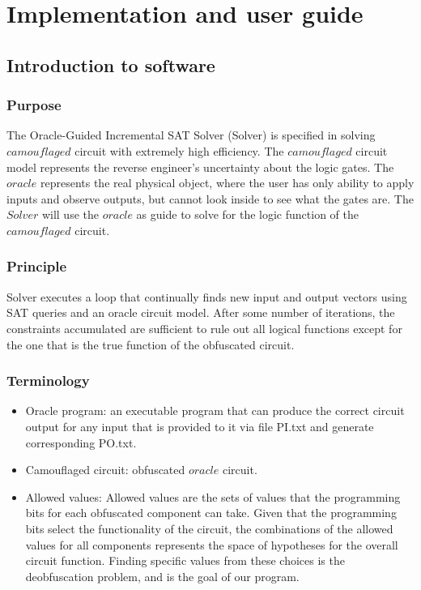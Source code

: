 \documentclass[proposal]{umassthesis}  %
\begin{document}
\chapter{Implementation and user guide}

\section{Introduction to software}
	\subsection{Purpose}
	The Oracle-Guided Incremental SAT Solver (Solver) is specified in solving $camouflaged$ circuit with extremely high efficiency. The $camouflaged$ circuit model represents the reverse engineer's uncertainty about the logic gates. The $oracle$ represents the real physical object, where the user has only ability to apply inputs and observe outputs, but cannot look inside to see what the gates are. The $Solver$ will use the $oracle$ as guide to solve for the logic function of the $camouflaged$ circuit. 	
	\subsection{Principle} 
	Solver executes a loop that continually finds new input and output vectors using SAT queries and an oracle circuit model. After some number of iterations, the constraints accumulated are sufficient to rule out all logical functions except for the one that is the true function of the obfuscated circuit. 
	\subsection{Terminology}
		\begin{itemize}
			\item Oracle program: an executable program that can produce the correct circuit output for any input that is provided to it via file PI.txt and generate corresponding PO.txt.
			\item Camouflaged circuit: obfuscated $oracle$ circuit.
			\item Allowed values: Allowed values are the sets of values that the programming bits for each obfuscated component can take. Given that the programming bits select the functionality of the circuit, the combinations of the allowed values for all components represents the space of hypotheses for the overall circuit function. Finding specific values from these choices is the deobfuscation problem, and is the goal of our program.
		\end{itemize}
\end{document}
